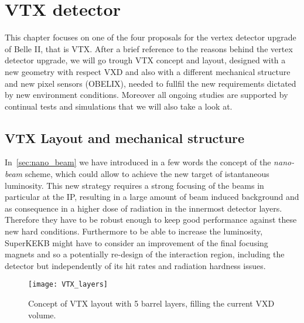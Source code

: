\chapter{VTX detector} \label{ch:VTX}


This chapter focuses on one of the four proposals for the vertex detector upgrade of Belle II, that is VTX. After a brief reference to the reasons behind the vertex detector upgrade, we will go trough VTX concept and layout, designed with a new geometry with respect VXD and also with a different mechanical structure and new pixel sensors (OBELIX), needed to fullfil the new requirements dictated by new environment conditions. Moreover all ongoing studies are supported by continual tests and simulations that we will also take a look at.


\section{VTX Layout and mechanical structure}

In~\autoref{sec:nano_beam} we have introduced in a few words the concept of the \textit{nano-beam} scheme, which could allow to achieve the new target of istantaneous luminosity. This new strategy requires a strong focusing of the beams in particular at the IP, resulting in a large amount of beam induced background and as consequence in a higher dose of radiation in the innermost detector layers. Therefore they have to be robust enough to keep good performance against these new hard conditions.
Furthermore to be able to increase the luminosity, SuperKEKB might have to consider an improvement of the final focusing magnets and so a potentially re-design of the interaction region, including the detector but independently of its hit rates and radiation hardness issues.\\

\begin{figure}[h!]
\centering
\texttt{[image: VTX\_layers]}
\caption{Concept of VTX layout with 5 barrel layers, filling the current VXD volume.}
\label{fig:VTX_layers}
\end{figure}


